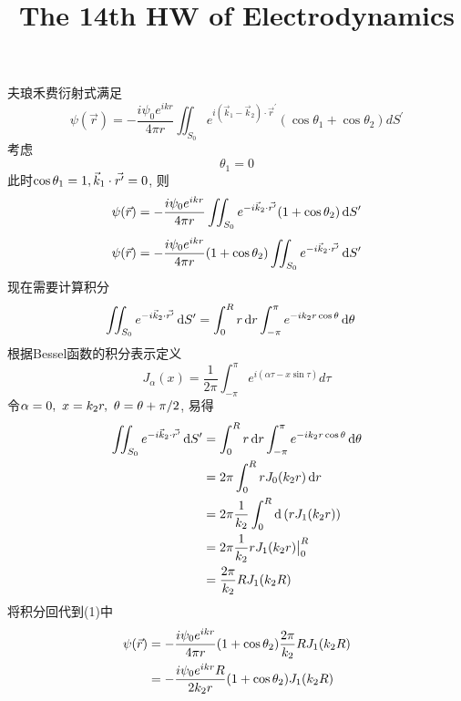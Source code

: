 \documentclass[UTF8,9pt]{ctexart}
\title{The 14th HW of Electrodynamics}
\begin{document}
 
\maketitle
{}
夫琅禾费衍射式满足
$$ 
\psi(\vec{r})=-\frac{i \psi_{0} e^{i k r}}{4 \pi r} \iint_{S_{0}} e^{i\left(\vec{k}_{1}-\vec{k}_{2}\right) \cdot \vec{r}^{\prime}}\left(\cos \theta_{1}+\cos \theta_{2}\right) d S^{\prime}
$$考虑$$ \theta_{1}=0$$
此时$\cos\theta_1=1,\vec{k}_1\cdot\vec{r'}=0$, 则$$ 
\psi(\vec{r})=-\frac{i \psi_0 e^{i k r}}{4 \pi r} \iint_{S_0} e^{-i\vec{k}_2 \cdot \vec{r'}}(1+\cos\theta_2)\mathop{}\!\mathrm{d} S'
$$
\begin{equation} 
\psi(\vec{r})=-\frac{i \psi_0 e^{i k r}}{4 \pi r}(1+\cos\theta_2) \iint_{S_0} e^{-i\vec{k}_2 \cdot \vec{r'}}\mathop{}\!\mathrm{d} S'
\end{equation}
现在需要计算积分
$$\begin{aligned} 
   \iint_{S_0} e^{-i\vec{k}_2 \cdot \vec{r'}}\mathop{}\!\mathrm{d} S' &= \int_0^R r\mathop{}\!\mathrm{d} r\int_{-\pi}^{\pi}e^{-ik_2r\cos\theta}\mathop{}\!\mathrm{d}\theta
 \end{aligned}$$
根据Bessel函数的积分表示定义$$J_{\alpha }(x)={\frac {1}{2\pi }}\int _{-\pi }^{\pi }e^{i(\alpha \tau -x\sin \tau )}d\tau $$
令$\alpha=0,\ x=k_2r,\ \theta=\theta+\pi/2$, 易得
$$\begin{aligned} \iint_{S_0} e^{-i\vec{k}_2 \cdot \vec{r'}}\mathop{}\!\mathrm{d} S'
  &= \int_0^R r\mathop{}\!\mathrm{d} r\int_{-\pi}^{\pi}e^{-ik_2r\cos\theta}\mathop{}\!\mathrm{d}\theta\\ &= 2\pi \int_0^R rJ_0(k_2r)\mathop{}\!\mathrm{d} r\\
  &= 2\pi \frac{1}{k_2}\int_0^R \mathop{}\!\mathrm{d}\left( rJ_1(k_2r) \right)\\
  &= 2\pi \frac{1}{k_2} rJ_1(k_2r)\big|_0^R\\
  &= \frac{2\pi}{k_2}RJ_1(k_2R)
 \end{aligned}$$
将积分回代到(1)中
$$\begin{aligned} 
  \psi(\vec{r})&=-\frac{i \psi_0 e^{i k r}}{4 \pi r}(1+\cos\theta_2) \frac{2\pi}{k_2}RJ_1(k_2R)\\
  &= -\frac{i \psi_0 e^{i k r}R}{2k_2 r}(1+\cos\theta_2)J_1(k_2R)\\
 \end{aligned}$$
\end{document}
